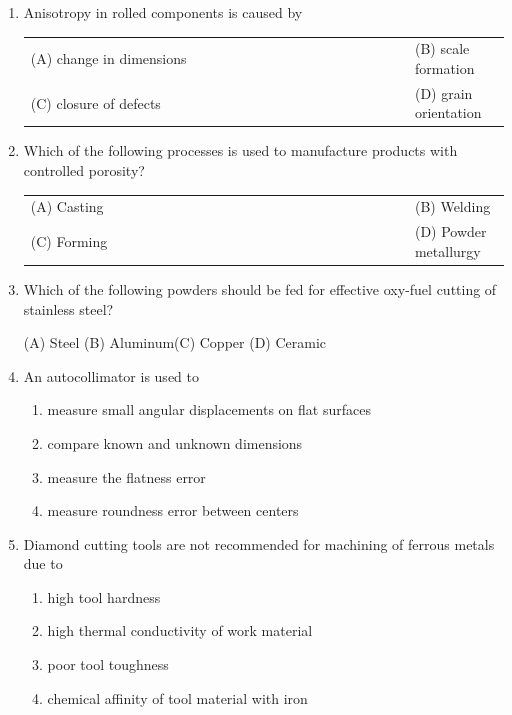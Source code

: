 \documentclass[a4paper,12pt]{article}
\begin{document}
\begin{enumerate}[label=Q.\arabic*, leftmargin=*]
\item Anisotropy in rolled components is caused by
\begin{multicols}{2}
\begin{tabular}[t]{p{0.8\linewidth} p{0.9\linewidth}}
(A) change in dimensions & (B) scale formation \\
(C) closure of defects & (D) grain orientation \\
\end{tabular}
\end{multicols}

\item Which of the following processes is used to manufacture products with controlled porosity?
\begin{multicols}{2}
\begin{tabular}[t]{p{0.8\linewidth} p{0.9\linewidth}}
(A) Casting & (B) Welding \\
(C) Forming & (D) Powder metallurgy \\
\end{tabular}
\end{multicols}

\item Which of the following powders should be fed for effective oxy-fuel cutting of stainless steel?

(A) Steel \hfill (B) Aluminum\hfill (C) Copper \hfill (D) Ceramic \\

\item An autocollimator is used to

\begin{enumerate}[label=(\Alph*)]
\item measure small angular displacements on flat surfaces
\item compare known and unknown dimensions
\item measure the flatness error
\item measure roundness error between centers
\end{enumerate}

\item Diamond cutting tools are not recommended for machining of ferrous metals due to

\begin{enumerate}[label=(\Alph*)]
\item high tool hardness
\item high thermal conductivity of work material
\item poor tool toughness
\item chemical affinity of tool material with iron
\end{enumerate}


\end{enumerate}
\end{document}
